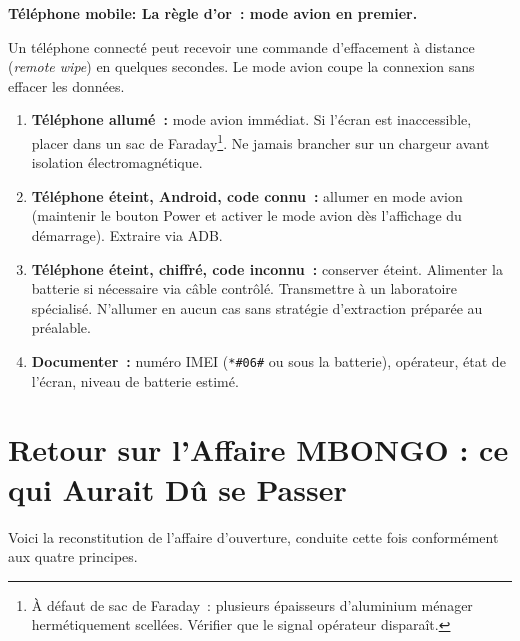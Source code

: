 \begin{boxPNC}
\textbf{Téléphone mobile: La règle d'or~: mode avion en premier.}

\medskip
Un téléphone connecté peut recevoir une commande d'effacement à distance
(\textit{remote wipe}) en quelques secondes. Le mode avion coupe la
connexion sans effacer les données.

\medskip
\begin{enumerate}
    \item \textbf{Téléphone allumé~:} mode avion immédiat. Si l'écran est
          inaccessible, placer dans un sac de Faraday\footnote{À défaut de
          sac de Faraday~: plusieurs épaisseurs d'aluminium ménager
          hermétiquement scellées. Vérifier que le signal opérateur disparaît.}.
          Ne jamais brancher sur un chargeur avant isolation électromagnétique.

    \item \textbf{Téléphone éteint, Android, code connu~:} allumer en mode
          avion (maintenir le bouton Power et activer le mode avion dès
          l'affichage du démarrage). Extraire via ADB.

    \item \textbf{Téléphone éteint, chiffré, code inconnu~:} conserver
          éteint. Alimenter la batterie si nécessaire via câble contrôlé.
          Transmettre à un laboratoire spécialisé. N'allumer en aucun cas
          sans stratégie d'extraction préparée au préalable.

    \item \textbf{Documenter~:} numéro IMEI (\texttt{*\#06\#} ou sous la
          batterie), opérateur, état de l'écran, niveau de batterie estimé.
\end{enumerate}
\end{boxPNC}

\section{Retour sur l'Affaire MBONGO : ce qui Aurait Dû se Passer}
\label{sec:retour-mbongo}

Voici la reconstitution de l'affaire d'ouverture, conduite cette fois
conformément aux quatre principes.

